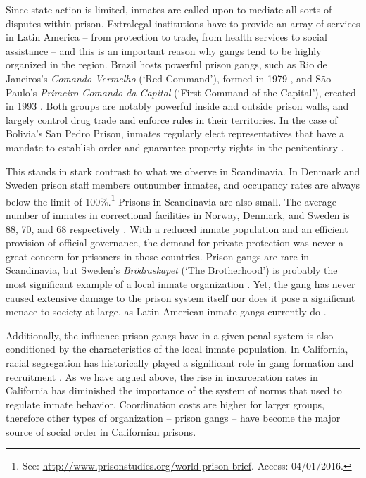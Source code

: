 \documentclass[a4paper, 12pt]{article}
\begin{document}
Since state action is limited, inmates are called upon to mediate all sorts of disputes within prison. Extralegal institutions have to provide an array of services in Latin America -- from protection to trade, from health services to social assistance -- and this is an important reason why gangs tend to be highly organized in the region. Brazil hosts powerful prison gangs, such as Rio de Janeiros's \textit{Comando Vermelho} (`Red Command'), formed in 1979 \citep{amorim2003cv,da2001quatrocentos}, and São Paulo's \textit{Primeiro Comando da Capital} (`First Command of the Capital'), created in 1993 \citep{biondi2010junto,dias2009guerra,souza2007pcc}. Both groups are notably powerful inside and outside prison walls, and largely control drug trade and enforce rules in their territories. In the case of Bolivia's San Pedro Prison, inmates regularly elect representatives that have a mandate to establish order and guarantee property rights in the penitentiary \citep{bbc2009carcel,skarbek2010self}. 

This stands in stark contrast to what we observe in Scandinavia. In Denmark and Sweden prison staff members outnumber inmates, and occupancy rates are always below the limit of 100\%.\footnote{See: \href{http://www.prisonstudies.org/world-prison-brief}{http://www.prisonstudies.org/world-prison-brief}. Access: 04/01/2016.} Prisons in Scandinavia are also small. The average number of inmates in correctional facilities in Norway, Denmark, and Sweden is 88, 70, and 68 respectively \citep{pratt2008scandinavian}. With a reduced inmate population and an efficient provision of official governance, the demand for private protection was never a great concern for prisoners in those countries. Prison gangs are rare in Scandinavia, but Sweden's \textit{Brödraskapet} (`The Brotherhood') is probably the most significant example of a local inmate organization \citep{larsson2011svensk}. Yet, the gang has never caused extensive damage to the prison system itself nor does it pose a significant menace to society at large, as Latin American inmate gangs currently do \citep{dias2009guerra,lessing2014build,wolf2010maras,wolf2012mara}.

Additionally, the influence prison gangs have in a given penal system is also conditioned by the characteristics of the local inmate population. In California, racial segregation has historically played a significant role in gang formation and recruitment \citep{blatchford2008black,camp1985prison,davidson1974chicano,skarbek2011governance}. As we have argued above, the rise in incarceration rates in California has diminished the importance of the system of norms that used to regulate inmate behavior. Coordination costs are higher for larger groups, therefore other types of organization -- prison gangs -- have become the major source of social order in Californian prisons. 
\end{document}
